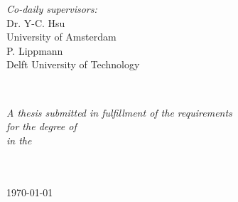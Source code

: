 \documentclass[
11pt, %
english, %
singlespacing, %
headsepline, %
]{MastersDoctoralThesis} %
\begin{document}
\begin{titlepage}
\begin{center}
\begin{minipage}[t]{0.5\textwidth}
            \begin{flushright} \large
                \emph{Co-daily supervisors:} \\
                Dr. Y-C. Hsu\\
                University of Amsterdam\\
                \vspace{5mm}
                P. Lippmann\\
                Delft University of Technology\\
            \end{flushright}


        \end{minipage}\\[1.5cm]

        \vfill

        \large \textit{A thesis submitted in fulfillment of the requirements\\ for the degree of \degreename}\\[0.3cm] %
        \textit{in the}\\[0.4cm]
        \groupname\\\deptname\\[1cm] %

        \vfill

        {\large \today}\\[1cm] %

        \vfill
    \end{center}
\end{titlepage}


\end{document}
